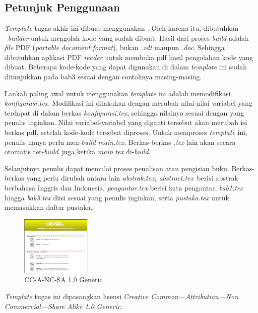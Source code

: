 \chapter{\babEmpat}

\section{Petunjuk Penggunaan}

\textit{Template} tugas akhir ini dibuat menggunakan \latex. Oleh karena itu, dibutuhkan \latex~\textit{builder} untuk mengolah kode yang sudah dibuat. Hasil dari proses \textit{build} adalah \textit{file} PDF (\textit{portable document format}), bukan \textit{.odt} maupun \textit{.doc}. Sehingga dibutuhkan aplikasi PDF \textit{reader} untuk membuka pdf hasil pengolahan kode yang dibuat. Beberapa kode-kode yang dapat digunakan di dalam \textit{template} ini sudah ditunjukkan pada bab3 sesuai dengan contohnya masing-masing.

Lankah paling awal untuk menggunakan \textit{template} ini adalah memodifikasi \textit{konfigurasi.tex}. Modifikasi ini dilakukan dengan merubah nilai-nilai variabel yang terdapat di dalam berkas \textit{konfigurasi.tex}, sehingga nilainya sesuai dengan yang penulis inginkan. Nilai variabel-variabel yang diganti tersebut akan merubah isi berkas pdf, setelah kode-kode tersebut diproses. Untuk memproses \textit{template} ini, penulis hanya perlu men-\textit{build} \textit{main.tex}. Berkas-berkas \textit{.tex} lain akan secara otomatis ter-\textit{build}~juga ketika \textit{main.tex} di-\textit{build}.

Selanjutnya penulis dapat memulai proses penulisan atau pengisian buku. Berkas-berkas yang perlu dirubah antara lain \textit{abstrak.tex, abstract.tex}~berisi abstrak berbahasa Inggris dan Indonesia, \textit{pengantar.tex} berisi kata pengantar, \textit{bab1.tex} hingga \textit{bab5.tex} diisi sesuai yang penulis inginkan, serta \textit{pustaka.tex} untuk memasukkan daftar pustaka.

\begin{figure}
	\centering
	\includegraphics[width=0.3\textwidth]
		{pics/creative_common.png}
		\caption{CC-A-NC-SA 1.0 Generic}
	\label{fig:CC10}
\end{figure}

\textit{Template} tugas ini dipasangkan lisensi \textit{Creative Common---Attribution---Non Commercial---Share Alike 1.0 Generic}.